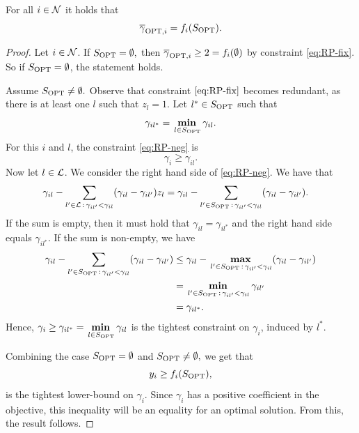 \begin{claim}\label{claim:TP_ramp-consN}
    For all $i \in \mathcal{N}$ it holds that
    \[\gopt[i] = f_i(\sopt).\]
\end{claim}


\begin{proof}
    Let $i \in \mathcal{N}$.
    If $S_{\text{OPT}} = \emptyset,$ then $\gopt[i] \geq 2 = f_i(\emptyset)$ by constraint \eqref{eq:RP-fix}.
    So if $S_{\text{OPT}} = \emptyset$, the statement holds.

    Assume $S_{\text{OPT}} \neq \emptyset.$
    Observe that constraint $\eqref{eq:RP-fix}$ becomes redundant, as there is at least one $l$ such that $z_l = 1$.
    Let $l^* \in S_{\text{OPT}}$ such that \[\gamma_{il^*} = \mathop{\text{\textbf{min}}}\limits_{\,l \in S_{\text{OPT}}} \gamma_{il}.\]
    For this $i$ and $l$, the constraint \eqref{eq:RP-neg} is
    \[\gamma_i \geq \gamma_{il}.\]
    Now let $l \in \mathcal{L}$.
    We consider the right hand side of \eqref{eq:RP-neg}.
    We have that
    \[\begin{split}
          \gamma_{il} - \sum_{l' \in \mathcal{L}\,:\,\gamma_{il'} < \gamma_{il}} (\gamma_{il} - \gamma_{il'}) z_l
          &= \gamma_{il} - \sum_{l' \in S_{\text{OPT}} \,:\,\gamma_{il'} < \gamma_{il}} (\gamma_{il} - \gamma_{il'}).
    \end{split}\]
    If the sum is empty, then it must hold that $\gamma_{il} = \gamma_{il^*}$ and the right hand side equals $\gamma_{il^*}$.
    If the sum is non-empty, we have
    \[
        \begin{split}
            \gamma_{il} - \sum_{l' \in S_{\text{OPT}} \,:\,\gamma_{il'} < \gamma_{il}} (\gamma_{il} - \gamma_{il'}) &\leq \gamma_{il} - \mathop{\text{\textbf{max}}}\limits_{\,l' \in S_{\text{OPT}} \,:\,\gamma_{il'} < \gamma_{il}} (\gamma_{il} - \gamma_{il'}) \\
            &= \mathop{\text{\textbf{min}}}\limits_{\,l' \in S_{\text{OPT}} \,:\,\gamma_{il'} < \gamma_{il}} \gamma_{il'} \\
            &= \gamma_{il^*}.
        \end{split}
    \]
    Hence, $\gamma_i \geq \gamma_{il^*} = \mathop{\text{\textbf{min}}}\limits_{\,l \in S_{\text{OPT}}} \gamma_{il}$ is the tightest constraint on $\gamma_i$, induced by $l^*$.

    Combining the case $S_{\text{OPT}} = \emptyset$ and $S_{\text{OPT}} \neq \emptyset,$ we get that
    \[
        y_i \geq f_i(S_{\text{OPT}}),
    \]
    is the tightest lower-bound on $\gamma_i$.
    Since $\gamma_i$ has a positive coefficient in the objective, this inequality will be an equality for an optimal solution.
    From this, the result follows.
\end{proof}

